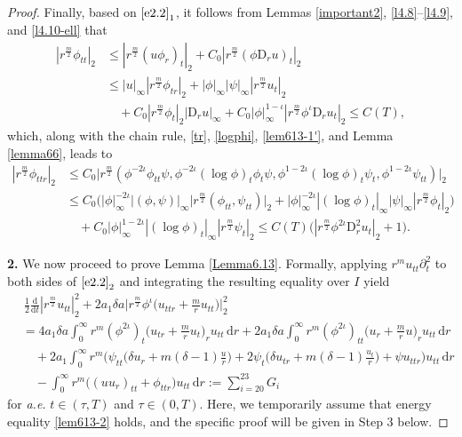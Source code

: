 \documentclass[11pt,reqno]{amsart}
\numberwithin{rk}{section}
\numberwithin{prop}{section}
\numberwithin{mydef}{section}
\numberwithin{lem}{section}
\numberwithin{equation}{section}
\numberwithin{thm}{section}
\begin{document}
\begin{proof}
Finally, based on $\eqref{e2.2}_1$, it follows from Lemmas \ref{important2}, \ref{l4.8}--\ref{l4.9}, 
and \ref{l4.10-ell} that
\begin{equation}\label{cal-phitt}
\begin{aligned}
|r^\frac{m}{2}\phi_{tt}|_2&\leq |r^\frac{m}{2}(u\phi_r)_t|_2+C_0|r^\frac{m}{2}(\phi\mathrm{D}_r u)_t|_2\\
&\leq |u|_\infty |r^\frac{m}{2}\phi_{tr}|_2+|\phi|_\infty|\psi|_\infty|r^\frac{m}{2}u_t|_2\\
&\quad +C_0|r^\frac{m}{2}\phi_t|_2 |\mathrm{D}_r u|_\infty+C_0|\phi|_\infty^{1-\iota} |r^\frac{m}{2}\phi^\iota\mathrm{D}_r u_t|_2\leq C(T),
\end{aligned}    
\end{equation}
which, along with the chain rule, \eqref{tr}, \eqref{logphi}, \eqref{lem613-1'}, and Lemma \ref{lemma66}, leads to
\begin{equation}\label{phittr}
\begin{aligned}
|r^\frac{m}{2}\phi_{ttr}|_2&\leq C_0\big|r^\frac{m}{2}(\phi^{-2\iota}\phi_{tt}\psi,\phi^{-2\iota}(\log\phi)_{t}\phi_t\psi,\phi^{1-2\iota}(\log\phi)_t\psi_t,\phi^{1-2\iota}\psi_{tt})\big|_2\\
&\leq C_0\big(|\phi|_\infty^{-2\iota}|(\phi,\psi)|_\infty \big|r^\frac{m}{2}(\phi_{tt},\psi_{tt})\big|_2+|\phi|_\infty^{-2\iota}|(\log\phi)_t|_\infty|\psi|_\infty |r^\frac{m}{2}\phi_{t}|_2\big)\\
&\quad + C_0|\phi|_\infty^{1-2\iota}|(\log\phi)_t|_\infty |r^\frac{m}{2}\psi_t|_2\leq C(T) \big(|r^\frac{m}{2}\phi^{2\iota}\mathrm{D}_r^2 u_t|_2+1\big).
\end{aligned}    
\end{equation}

\vspace{1pt}
\textbf{2.} We now proceed to prove Lemma \ref{Lemma6.13}. 
Formally, applying $r^mu_{tt}\partial_{t}^2$ to both sides of $\eqref{e2.2}_2$ and integrating the resulting equality over $I$ yield
\begin{equation}\label{lem613-2}
\begin{aligned}
&\,\frac{1}{2}\frac{\mathrm{d}}{\mathrm{d}t}|r^\frac{m}{2}u_{tt}|_2^2+2a_1\delta a\Big|r^\frac{m}{2}\phi^\iota\big(u_{ttr}+\frac{m}{r}u_{tt}\big)\Big|_2^2 \\
&=4a_1\delta a\int_0^\infty r^m (\phi^{2\iota})_t\big(u_{tr}+\frac{m}{r}u_t\big)_r u_{tt}\,\mathrm{d}r +2a_1\delta a\int_0^\infty r^m(\phi^{2\iota})_{tt}\big(u_{r}+\frac{m}{r}u\big)_r u_{tt}\,\mathrm{d}r\\
&\quad +2a_1\int_0^\infty r^m \Big(\psi_{tt}\big(\delta u_r+m(\delta-1)\frac{u}{r}\big) +2\psi_t\big(\delta u_{tr}+m(\delta-1)\frac{u_t}{r}\big)+\psi u_{ttr}\Big) u_{tt}\,\mathrm{d}r\\
&\quad -\int_0^\infty r^m\big((uu_r)_{tt}+\phi_{ttr}\big)u_{tt}\,\mathrm{d}r:=\sum_{i=20}^{23}G_i
\end{aligned}
\end{equation}
for {\it a.e.} $t\in (\tau,T)$ and $\tau\in (0,T)$. Here, we temporarily assume that energy equality \eqref{lem613-2} holds, and the specific proof will be given in Step 3 below.



\end{proof}
\end{document}
